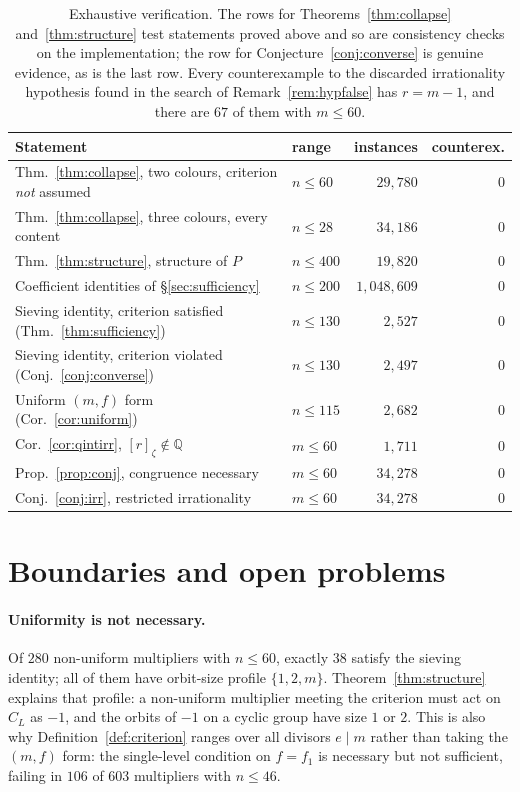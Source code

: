 \documentclass[11pt,a4paper]{article}
\theoremstyle{plain}
\theoremstyle{definition}
\theoremstyle{remark}
\newcommand{\Q}{\mathbb{Q}}
\begin{document}
\begin{table}[h]
\centering
\small
\begin{tabular}{llrr}
Statement & range & instances & counterex.\\\hline
Thm.~\ref{thm:collapse}, two colours, criterion \emph{not} assumed & $n\le 60$ & $29{,}780$ & $0$\\
Thm.~\ref{thm:collapse}, three colours, every content & $n\le 28$ & $34{,}186$ & $0$\\
Thm.~\ref{thm:structure}, structure of $P$ & $n\le 400$ & $19{,}820$ & $0$\\
Coefficient identities of \S\ref{sec:sufficiency} & $n\le 200$ & $1{,}048{,}609$ & $0$\\
Sieving identity, criterion satisfied (Thm.~\ref{thm:sufficiency}) & $n\le 130$ & $2{,}527$ & $0$\\
Sieving identity, criterion violated (Conj.~\ref{conj:converse}) & $n\le 130$ & $2{,}497$ & $0$\\
Uniform $(m,f)$ form (Cor.~\ref{cor:uniform}) & $n\le 115$ & $2{,}682$ & $0$\\
Cor.~\ref{cor:qintirr}, $[r]_\zeta\notin\Q$ & $m\le 60$ & $1{,}711$ & $0$\\
Prop.~\ref{prop:conj}, congruence necessary & $m\le 60$ & $34{,}278$ & $0$\\
Conj.~\ref{conj:irr}, restricted irrationality & $m\le 60$ & $34{,}278$ & $0$\\
\end{tabular}
\caption{Exhaustive verification. The rows for Theorems~\ref{thm:collapse}
and~\ref{thm:structure} test statements proved above and so are consistency checks on the
implementation; the row for Conjecture~\ref{conj:converse} is genuine evidence, as is the
last row. Every counterexample to the discarded irrationality hypothesis found in the search
of Remark~\ref{rem:hypfalse} has $r=m-1$, and there are $67$ of them with $m\le60$.}
\label{tab:verification}
\end{table}

\section{Boundaries and open problems}\label{sec:open}

\paragraph{Uniformity is not necessary.} Of $280$ non-uniform multipliers with $n\le60$,
exactly $38$ satisfy the sieving identity; all of them have orbit-size profile
$\{1,2,m\}$. Theorem~\ref{thm:structure} explains that profile: a non-uniform multiplier
meeting the criterion must act on $C_L$ as $-1$, and the orbits of $-1$ on a cyclic group
have size $1$ or $2$. This is also why Definition~\ref{def:criterion} ranges over all
divisors $e\mid m$ rather than taking the $(m,f)$ form: the single-level condition on
$f=f_1$ is necessary but not sufficient, failing in $106$ of $603$ multipliers with
$n\le46$.
\end{document}
